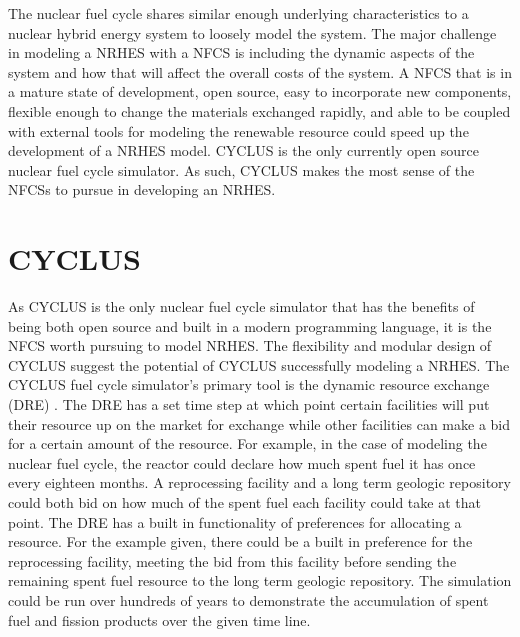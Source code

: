 \documentclass[12pt]{UIdahoMastersThesis}
\begin{document}
The nuclear fuel cycle shares similar enough underlying characteristics to a nuclear hybrid energy system to loosely model the system. The major challenge in modeling a NRHES with a NFCS is including the dynamic aspects of the system and how that will affect the overall costs of the system. A NFCS that is in a mature state of development, open source, easy to incorporate new components, flexible enough to change the materials exchanged rapidly, and able to be coupled with external tools for modeling the renewable resource could speed up the development of a NRHES model. CYCLUS is the only currently open source nuclear fuel cycle simulator.  As such, CYCLUS makes the most sense of the NFCSs to pursue in developing an NRHES.

\section{CYCLUS}

As CYCLUS is the only nuclear fuel cycle simulator that has the benefits of being both open source and built in a modern programming language, it is the NFCS worth pursuing to model NRHES. The flexibility and modular design of CYCLUS suggest the potential of CYCLUS successfully modeling a NRHES. The CYCLUS fuel cycle simulator's primary tool is the dynamic resource exchange (DRE) \cite{Huff2016}.  The DRE has a set time step at which point certain facilities will put their resource up on the market for exchange while other facilities can make a bid for a certain amount of the resource. For example, in the case of modeling the nuclear fuel cycle, the reactor could declare how much spent fuel it has once every eighteen months.  A reprocessing facility and a long term geologic repository could both bid on how much of the spent fuel each facility could take at that point.  The DRE has a built in functionality of preferences for allocating a resource.  For the example given, there could be a built in preference for the reprocessing facility, meeting the bid from this facility before sending the remaining spent fuel resource to the long term geologic repository. The simulation could be run over hundreds of years to demonstrate the accumulation of spent fuel and fission products over the given time line. 
\end{document}
